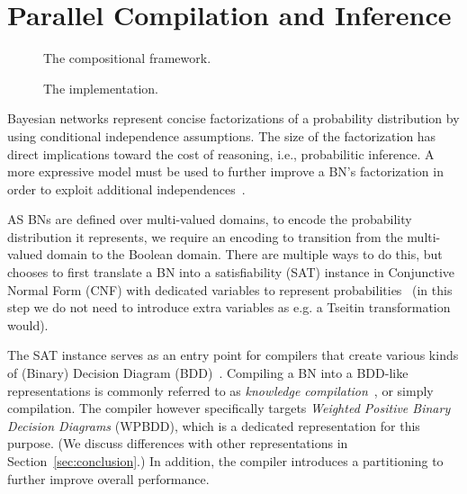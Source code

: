 
\section{Parallel Compilation and Inference}
\label{secjjparallel}

\begin{figure}[!t]
    \centering
    \scalebox{0.6}{
        
    }
    \caption{The compositional framework.}
    \label{fig:frameworkoverview}
\end{figure}

\begin{figure}[!t]
    \centering
    
    \caption{The implementation.}
    \label{fig:implementation}
\end{figure}


Bayesian networks represent concise factorizations of a probability distribution by using conditional independence assumptions. The size of the factorization has direct implications toward the cost of reasoning, i.e., probabilitic inference. A more expressive model must be used to further improve a BN's factorization in order to exploit additional independences~\cite{boutilier1996context,friedman1998learning,zhang1996exploiting}.

AS BNs are defined over multi-valued domains, to encode the probability distribution it represents, we require an encoding  to transition from the multi-valued domain to the Boolean domain. There are multiple ways to do this, but \toolname chooses to first translate a BN into a satisfiability (SAT) instance in Conjunctive Normal Form (CNF) with dedicated variables to represent probabilities~\cite{dal2017wpbdd} (in this step we do not need to introduce extra variables as e.g. a Tseitin transformation would).

The SAT instance serves as an entry point for compilers that create various kinds of (Binary) Decision Diagram (BDD)~\cite{dudek2020addmc}. Compiling a BN into a BDD-like representations is commonly referred to as \emph{knowledge compilation}~\cite{darwiche2002knowledge}, or simply compilation. The \toolname compiler however specifically targets \emph{Weighted Positive Binary Decision Diagrams} (WPBDD), which is a dedicated representation for this purpose. (We discuss differences with other representations in Section~\ref{sec:conclusion}.)
	In addition, the compiler introduces a partitioning to further improve overall performance.


